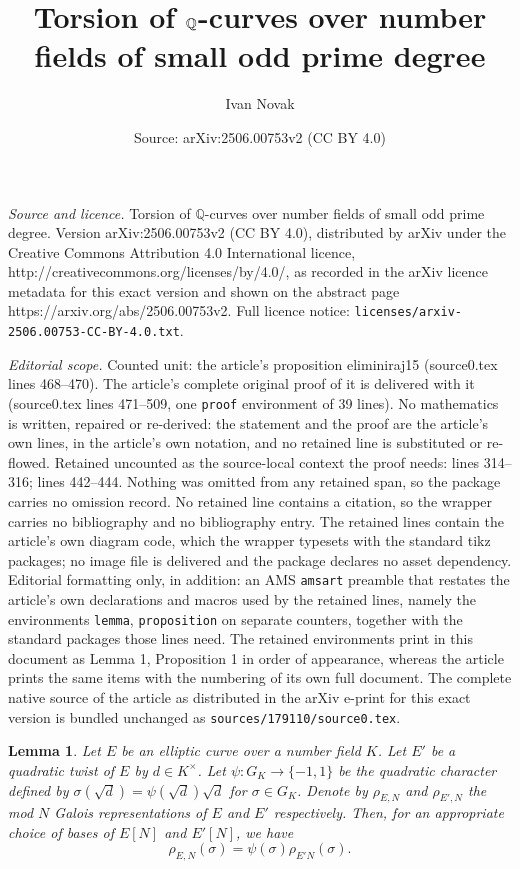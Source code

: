 \documentclass[10pt,a4paper]{amsart}
\title{Torsion of $\Q$-curves over number fields of small odd prime degree}
\author{Ivan Novak}
\date{Source: arXiv:2506.00753v2 (CC BY 4.0)}
\newtheorem{lemma}{Lemma}
\newcommand{\Q}{\mathbb{Q}}
\begin{document}
\maketitle

\noindent\emph{Source and licence.} Torsion of $\Q$-curves over number fields of small odd prime degree. Version arXiv:2506.00753v2 (CC BY 4.0), distributed by arXiv under the Creative Commons Attribution 4.0 International licence, http://creativecommons.org/licenses/by/4.0/, as recorded in the arXiv licence metadata for this exact version and shown on the abstract page https://arxiv.org/abs/2506.00753v2. Full licence notice: \texttt{licenses/arxiv-2506.00753-CC-BY-4.0.txt}.\par\smallskip

\noindent\textit{Editorial scope.} Counted unit: the article's proposition eliminiraj15 (source0.tex lines 468--470). The article's complete original proof of it is delivered with it (source0.tex lines 471--509, one \texttt{proof} environment of 39 lines). No mathematics is written, repaired or re-derived: the statement and the proof are the article's own lines, in the article's own notation, and no retained line is substituted or re-flowed.  Retained uncounted as the source-local context the proof needs: lines 314--316; lines 442--444.  Nothing was omitted from any retained span, so the package carries no omission record.  No retained line contains a citation, so the wrapper carries no bibliography and no bibliography entry.  The retained lines contain the article's own diagram code, which the wrapper typesets with the standard tikz packages; no image file is delivered and the package declares no asset dependency.  Editorial formatting only, in addition: an AMS \texttt{amsart} preamble that restates the article's own declarations and macros used by the retained lines, namely the environments \texttt{lemma}, \texttt{proposition} on separate counters, together with the standard packages those lines need.  The retained environments print in this document as Lemma 1, Proposition 1 in order of appearance, whereas the article prints the same items with the numbering of its own full document.  The complete native source of the article as distributed in the arXiv e-print for this exact version is bundled unchanged as \texttt{sources/179110/source0.tex}.
\begin{lemma}\label{twistanje}
    Let $E$ be an elliptic curve over a number field $K$. Let $E'$ be a quadratic twist of $E$ by $d \in K^\times$. Let $\psi:G_K \to \{-1, 1\}$ be the quadratic character defined by $\sigma(\sqrt{d})=\psi(\sqrt d) \sqrt d$ for $\sigma \in G_K$. Denote by $\rho_{E, N}$ and $\rho_{E', N}$ the mod $N$ Galois representations of $E$ and $E'$ respectively. Then, for an appropriate choice of bases of $E[N]$ and $E'[N]$, we have $$\rho_{E, N}(\sigma)=\psi(\sigma)\rho_{E'N}(\sigma).$$
\end{lemma}
\end{document}
